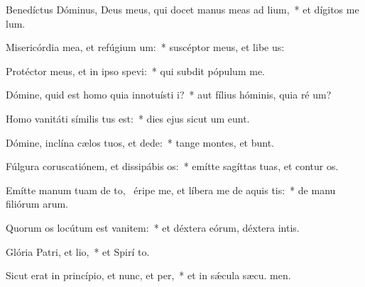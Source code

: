 \item Benedíctus Dóminus, Deus meus, qui docet manus meas ad lium,~* et dígitos me  lum.
\item Misericórdia mea, et refúgium um:~* suscéptor meus, et libe us:
\item Protéctor meus, et in ipso spevi:~* qui subdit pópulum   me.
\item Dómine, quid est homo quia innotuísti i?~* aut fílius hóminis, quia ré um?
\item Homo vanitáti símilis tus est:~* dies ejus sicut um eunt.
\item Dómine, inclína cælos tuos, et dede:~* tange montes, et bunt.
\item Fúlgura coruscatiónem, et dissipábis os:~* emítte sagíttas tuas, et contur os.
\item Emítte manum tuam de to,~\pscross{} éripe me, et líbera me de aquis tis:~* de manu filiórum arum.
\item Quorum os locútum est vanitem:~* et déxtera eórum, déxtera intis.
\item Glória Patri, et lio,~* et Spirí to.
\item Sicut erat in princípio, et nunc, et per,~* et in sǽcula sæcu. men.
